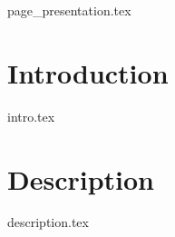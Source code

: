 \documentclass[12pt]{article}
\begin{document}
	
{page_presentation.tex}
\section{Introduction}

{intro.tex}
\section{Description}
{description.tex}

%
%
\end{document}
